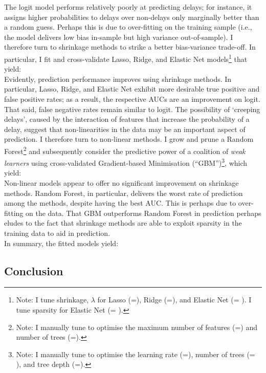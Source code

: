 \documentclass[
]{article}
\begin{document}
The logit model performs relatively poorly at predicting delays; for
instance, it assigns higher probabilities to delays over non-delays only
marginally better than a random guess. Perhaps this is due to
over-fitting on the training sample (i.e., the model delivers low bias
in-sample but high variance out-of-sample). I therefore turn to
shrinkage methods to strike a better bias-variance trade-off. In
particular, I fit and cross-validate Lasso, Ridge, and Elastic Net
models\footnote{Note: I tune shrinkage, $\lambda$ for Lasso (=), Ridge (=), and Elastic Net (= ). I tune sparsity for Elastic Net (= ).}
that yield:\\

Evidently, prediction performance improves using shrinkage methods. In
particular, Lasso, Ridge, and Elastic Net exhibit more desirable true
positive and false positive rates; as a result, the respective AUCs are
an improvement on logit. That said, false negative rates remain similar
to logit. The possibility of `creeping delays', caused by the
interaction of features that increase the probability of a delay,
suggest that non-linearities in the data may be an important aspect of
prediction. I therefore turn to non-linear methods. I grow and prune a
Random
Forest\footnote{Note: I manually tune to optimise the maximum number of features (=) and number of trees (=).}
and subsequently consider the predictive power of a coalition of
\textit{weak learners} using cross-validated Gradient-based Minimisation
(``GBM'')\footnote{Note: I manually tune to optimise the learning rate (=), number of trees (= ), and tree depth (=).},
which yield:\\

Non-linear models appear to offer no significant improvement on
shrinkage methods. Random Forest, in particular, delivers the worst rate
of prediction among the methods, despite having the best AUC. This is
perhaps due to over-fitting on the data. That GBM outperforms Random
Forest in prediction perhaps eludes to the fact that shrinkage methods
are able to exploit sparsity in the training data to aid in
prediction.\\

In summary, the fitted models yield:\\

\subsection{Conclusion}
\end{document}
